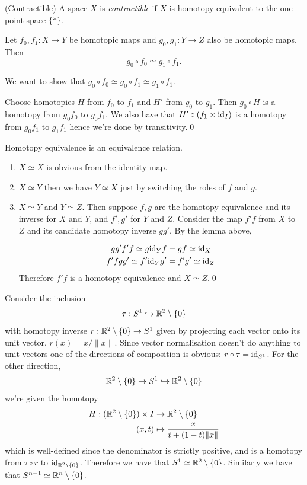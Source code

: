 \documentclass{article}
\begin{document}
\begin{definition}
	(Contractible) A space $ X $ is \textit{contractible} if $ X $ is homotopy equivalent to the one-point space $ \{*\} $.
\end{definition}
\begin{lemma}
  Let $ f_0,f_1 : X\to Y $ be homotopic maps and $ g_0,g_1 : Y\to Z $ also be homotopic maps. Then
  \[
    g_0 \circ f_0 \simeq g_1 \circ f_1.
  \]
\end{lemma}
\pf We want to show that $ g_0\circ f_0 \simeq g_0\circ f_1 \simeq g_1 \circ f_1 $.\par
Choose homotopies $ H $ from $ f_0 $ to $ f_1 $ and $ H' $ from $ g_0 $ to $ g_1 $. Then $ g_0 \circ H $ is a homotopy from $ g_0f_0 $ to $ g_0f_1 $. We also have that $ H'\circ (f_1 \times \mathrm{id}_I) $ is a homotopy from $ g_0f_1 $ to $ g_1f_1 $ hence we're done by transitivity.\qed
\begin{proposition}
  Homotopy equivalence is an equivalence relation.
\end{proposition}
\pf
\begin{enumerate}
	\item $ X\simeq X $ is obvious from the identity map.
	\item $ X\simeq Y $ then we have $ Y\simeq X $ just by switching the roles of $ f $ and $ g $.
	\item $ X \simeq Y $ and $ Y \simeq Z $. Then suppose $ f,g $ are the homotopy equivalence and its inverse for $ X $ and $ Y $, and $ f',g' $ for $ Y $ and $ Z $. Consider the map $ f'f $ from $ X $ to $ Z $ and its candidate homotopy inverse $ gg' $. By the lemma above,\par
		\begin{align*}
			gg'f'f \simeq g\mathrm{id}_Y f &= gf \simeq \mathrm{id} _X \\
			f'fgg'\simeq f'\mathrm{id}_Y g' &= f'g' \simeq \mathrm{id}_Z
		\end{align*}
		Therefore $ f'f $ is a homotopy equivalence and $ X\simeq Z $.\qed
\end{enumerate}
\begin{example}
  Consider the inclusion
  \[
	  \tau: S^1 \hookrightarrow \mathbb{R}^2\setminus \{0\}
  \]
  with homotopy inverse $ r : \mathbb{R}^2 \setminus \{0\} \to S^1 $ given by projecting each vector onto its unit vector, $ r(x) = x/\|x\| $. Since vector normalisation doesn't do anything to unit vectors one of the directions of composition is obvious: $ r\circ\tau = \mathrm{id}_{S^1} $. For the other direction,
  \[
	  \mathbb{R}^2 \setminus \{0\} \to S^1 \hookrightarrow \mathbb{R}^2 \setminus \{0\}
  \]
  we're given the homotopy
  \begin{align*}
	  H : (\mathbb{R}^2 \setminus \{0\}) \times I &\to \mathbb{R}^2\setminus \{0\}\\
	  (x,t) &\mapsto \frac{x}{t+(1-t)\|x\|}
  \end{align*}
  which is well-defined since the denominator is strictly positive, and is a homotopy from $ \tau \circ r $ to $ \mathrm{id}_{\mathbb{R}^2 \setminus \{0\}} $. Therefore we have that $ S^1 \simeq \mathbb{R}^2 \setminus \{0\} $. Similarly we have that $ S^{n-1} \simeq \mathbb{R}^n \setminus \{0\}$.
\end{example}
\end{document}
